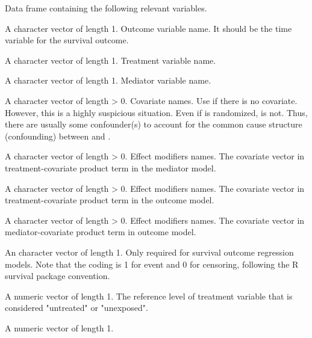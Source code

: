 \documentclass[a4paper]{book}
\begin{document}
\begin{Arguments}
\begin{ldescription}
\item[\code{data}] Data frame containing the following relevant variables.

\item[\code{yvar}] A character vector of length 1. Outcome variable name. It should be the time variable for the survival outcome.

\item[\code{avar}] A character vector of length 1. Treatment variable name.

\item[\code{mvar}] A character vector of length 1. Mediator variable name.

\item[\code{cvar}] A character vector of length > 0. Covariate names. Use  if there is no covariate. However, this is a highly suspicious situation. Even if  is randomized,  is not. Thus, there are usually some confounder(s) to account for the common cause structure (confounding) between  and .

\item[\code{emm\_ac\_mreg}] A character vector of length > 0. Effect modifiers names. The covariate vector in treatment-covariate product term in the mediator model.

\item[\code{emm\_ac\_yreg}] A character vector of length > 0. Effect modifiers names. The covariate vector in treatment-covariate product term in the outcome model.

\item[\code{emm\_mc\_yreg}] A character vector of length > 0. Effect modifiers names. The covariate vector in mediator-covariate product term in outcome model.

\item[\code{eventvar}] An character vector of length 1. Only required for survival outcome regression models. Note that the coding is 1 for event and 0 for censoring, following the R survival package convention.

\item[\code{a0}] A numeric vector of length 1. The reference level of treatment variable that is considered "untreated" or "unexposed".

\item[\code{a1}] A numeric vector of length 1.


\end{ldescription}
\end{Arguments}
\end{document}
